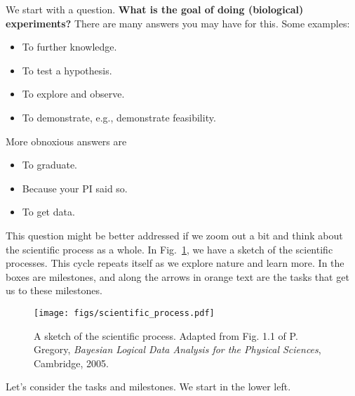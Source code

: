 We start with a question.  \textbf{What is the goal of doing
  (biological) experiments?}  There are many answers you may have for
this.  Some examples:
\begin{itemize}
\item To further knowledge.
\item To test a hypothesis.
\item To explore and observe.
\item To demonstrate, e.g., demonstrate feasibility.
\end{itemize}

More obnoxious answers are
\begin{itemize}
\item To graduate.
\item Because your PI said so.
\item To get data.
\end{itemize}

This question might be better addressed if we zoom out a bit and think
about the scientific process as a whole.  In
Fig.~\ref{fig:scientific_process}, we have a sketch of the scientific
processes.  This cycle repeats itself as we explore nature and learn
more.  In the boxes are milestones, and along the arrows in orange text
are the tasks that get us to these milestones.

\begin{figure}[h]
\centerline{
        \texttt{[image: figs/scientific\_process.pdf]}}
      \caption{A sketch of the scientific process.  Adapted from
        Fig. 1.1 of P. Gregory, \textit{Bayesian Logical Data Analysis
          for the Physical Sciences}, Cambridge, 2005.}
\label{fig:scientific_process}
\end{figure}

Let's consider the tasks and milestones.  We start in the lower left.

